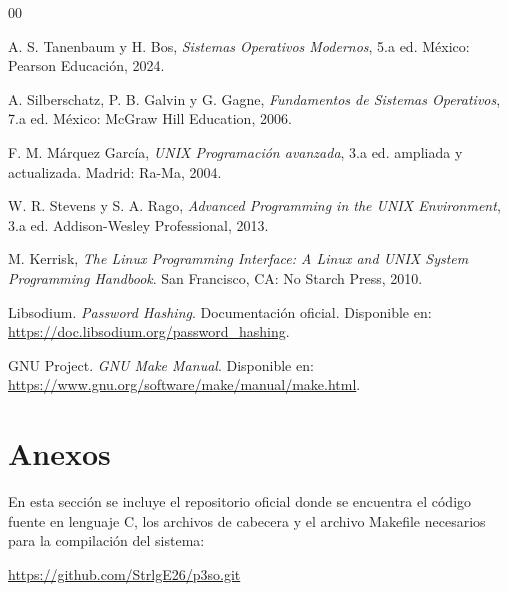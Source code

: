 \documentclass[11pt, letterpaper]{article}
\begin{document}
\begin{thebibliography}{00}

A. S. Tanenbaum y H. Bos, \textit{Sistemas Operativos Modernos}, 5.a ed.
México: Pearson Educación, 2024.

A. Silberschatz, P. B. Galvin y G. Gagne,
\textit{Fundamentos de Sistemas Operativos}, 7.a ed.
México: McGraw Hill Education, 2006.

F. M. Márquez García, \textit{UNIX Programación avanzada},
3.a ed. ampliada y actualizada. Madrid: Ra-Ma, 2004.

W. R. Stevens y S. A. Rago,
\textit{Advanced Programming in the UNIX Environment}, 3.a ed.
Addison-Wesley Professional, 2013.

M. Kerrisk,
\textit{The Linux Programming Interface: A Linux and UNIX System Programming Handbook}.
San Francisco, CA: No Starch Press, 2010.

Libsodium. \textit{Password Hashing}. Documentación oficial.
Disponible en: \url{https://doc.libsodium.org/password_hashing}.

GNU Project. \textit{GNU Make Manual}.
Disponible en: \url{https://www.gnu.org/software/make/manual/make.html}.

\end{thebibliography}

\newpage

\section*{Anexos}
{}
En esta sección se incluye el repositorio oficial donde se encuentra el código fuente en lenguaje C, los archivos de cabecera y el archivo Makefile necesarios para la compilación del sistema:
\begin{center}
    \url{https://github.com/StrlgE26/p3so.git}
\end{center}
\end{document}
